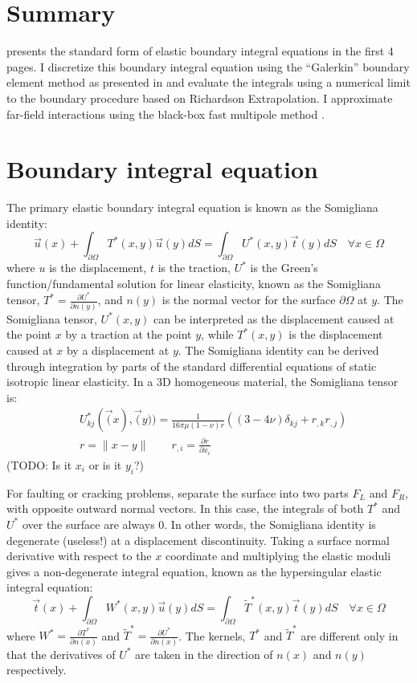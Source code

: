 \documentclass[a4paper]{article}
\newcommand{\pO}{\partial \Omega}
\begin{document}
\section*{Summary}
\citet{Cruse1969} presents the standard form of elastic boundary integral equations in the first 4 pages. I discretize this boundary integral equation using the ``Galerkin'' boundary element method as presented in \citep{Sutradhar2008} and evaluate the integrals using a numerical limit to the boundary procedure based on Richardson Extrapolation. I approximate far-field interactions using the black-box fast multipole method \citep{Fong2009}.

\section*{Boundary integral equation}
The primary elastic boundary integral equation is known as the Somigliana identity:
\begin{equation}
\vec{u}(x) + \int_{\pO} T^*(x, y)\vec{u}(y) dS = \int_{\pO} U^*(x,y)\vec{t}(y) dS \quad \forall x \in \Omega
\label{somigliana}
\end{equation}
where $u$ is the displacement, $t$ is the traction, $U^*$ is the Green's function/fundamental solution for linear elasticity, known as the Somigliana tensor, $T^* = \frac{\partial U^*}{\partial n(y)}$, and $n(y)$ is the normal vector for the surface $\pO$ at $y$. The Somigliana tensor, $U^*(x,y)$ can be interpreted as the displacement caused at the point $x$ by a traction at the point $y$, while $T^*(x,y)$ is the displacement caused at $x$ by a displacement at $y$. The Somigliana identity can be derived through integration by parts of the standard differential equations of static isotropic linear elasticity. In a 3D homogeneous material, the Somigliana tensor is:
\begin{align}
    &U^*_{kj}(\vec(x),\vec(y)) = \frac{1}{16\pi\mu(1-\nu)r}\left((3 - 4\nu)\delta_{kj} + r_{,k}r_{,j}\right)\\
    &r = \|x - y\|\quad \quad r_{,i} = \frac{\partial r}{\partial x_i} 
\end{align}
(TODO: Is it $x_i$ or is it $y_i$?)

For faulting or cracking problems, separate the surface into two parts $F_L$ and $F_R$, with opposite outward normal vectors. In this case, the integrals of both $T^*$ and $U^*$ over the surface are always 0. In other words, the Somigliana identity is degenerate (useless!) at a displacement discontinuity. Taking a surface normal derivative with respect to the $x$ coordinate and multiplying the elastic moduli gives a non-degenerate integral equation, known as the hypersingular elastic integral equation:
\begin{equation}
    \vec{t}(x) + \int_{\pO} W^*(x, y)\vec{u}(y) dS = \int_{\pO} \widetilde{T}^*(x,y)\vec{t}(y) dS \quad \forall x \in \Omega
    \label{hypersingular}
\end{equation}
where $W^* = \frac{\partial T^*}{\partial n(x)}$ and $\widetilde{T}^* = \frac{\partial U^*}{\partial n(x)}$. The kernels, $T^*$ and $\widetilde{T}^*$ are different only in that the derivatives of $U^*$ are taken in the direction of $n(x)$ and $n(y)$ respectively.
\end{document}

